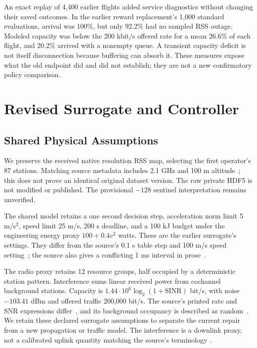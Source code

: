 \documentclass[conference]{IEEEtran}
\begin{document}
An exact replay of 4,400 earlier flights added service diagnostics without
changing their saved outcomes. In the earlier reward replacement's 1,000
standard evaluations, arrival was 100\%, but only 92.2\% had no sampled RSS
outage. Modeled capacity was below the 200 kbit/s offered rate for a mean
26.6\% of each flight, and 20.2\% arrived with a nonempty queue. A transient
capacity deficit is not itself disconnection because buffering can absorb it.
These measures expose what the old endpoint did and did not establish; they
are not a new confirmatory policy comparison.

\section{Revised Surrogate and Controller}
\subsection{Shared Physical Assumptions}
We preserve the received native resolution RSS map, selecting the first
operator's 87 stations. Matching source metadata includes 2.1 GHz and 100 m
altitude~\cite[p.~7, Table~2; p.~15, Table~3]{thesis}; this does not prove an
identical original dataset version. The raw private HDF5 is not modified or
published. The provisional $-128$ sentinel interpretation remains unverified.

The shared model retains a one second decision step, acceleration norm limit
5 m/s$^2$, speed limit 25 m/s, 200 s deadline, and a 100 kJ budget under the
engineering energy proxy $100+0.4v^2$ watts. These are the earlier surrogate's
settings. They differ from the source's 0.1 s table step and 100 m/s speed
setting~\cite[p.~15, Table~3]{thesis}; the source also gives a conflicting
1 ms interval in prose~\cite[p.~14, Sec.~6.1]{thesis}.

The radio proxy retains 12 resource groups, half occupied by a deterministic
station pattern. Interference sums linear received power from cochannel
background stations. Capacity is $1.44\cdot10^6\log_2(1+\mathrm{SINR})$ bit/s,
with noise $-103.41$ dBm and offered traffic 200,000 bit/s. The source's printed
rate and SNR expressions differ~\cite[p.~10, Eqs.~(7)--(8)]{thesis}, and its
background occupancy is described as random~\cite[p.~14, Sec.~6.1]{thesis}.
We retain these declared surrogate assumptions to separate the current repair
from a new propagation or traffic model. The interference is a downlink proxy,
not a calibrated uplink quantity matching the source's terminology
\cite[p.~10, Eq.~(9)]{thesis}.
\end{document}
